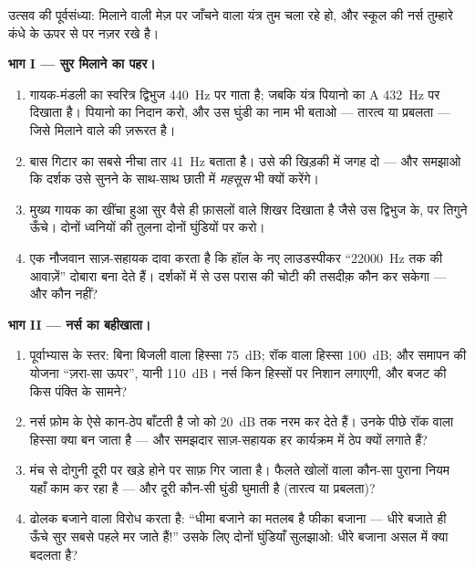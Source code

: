 \begin{problem}\label{pb:g8:sound-pitch-loudness:1}
उत्सव की पूर्वसंध्या: मिलाने वाली मेज़ पर जाँचने वाला यंत्र तुम चला
रहे हो, और स्कूल की नर्स तुम्हारे कंधे के ऊपर से   पर नज़र
रखे है।

\medskip\noindent\textbf{भाग I --- सुर मिलाने का पहर।}
\begin{enumerate}
  \item गायक-मंडली का स्वरित्र द्विभुज \qty{440}{Hz} पर गाता है;
        जबकि यंत्र पियानो का A \qty{432}{Hz} पर दिखाता है। पियानो
        का निदान करो, और उस घुंडी का नाम भी बताओ --- तारत्व या
        प्रबलता --- जिसे मिलाने वाले की ज़रूरत है।
  \item बास गिटार का सबसे नीचा तार \qty{41}{Hz} बताता है। उसे 
        की खिड़की में जगह दो --- और समझाओ कि दर्शक उसे सुनने के साथ-साथ
        छाती में \emph{महसूस} भी क्यों करेंगे।
  \item मुख्य गायक का खींचा हुआ सुर वैसे ही फ़ासलों वाले शिखर दिखाता
        है जैसे उस द्विभुज के, पर तिगुने ऊँचे। दोनों ध्वनियों की
        तुलना दोनों घुंडियों पर करो।
  \item एक नौजवान साज़-सहायक दावा करता है कि हॉल के नए लाउडस्पीकर
        ``\qty{22000}{Hz} तक की आवाज़ें'' दोबारा बना देते हैं। दर्शकों
        में से उस परास की चोटी की तसदीक़ कौन कर सकेगा --- और कौन
        नहीं?
\end{enumerate}

\medskip\noindent\textbf{भाग II --- नर्स का बहीखाता।}
\begin{enumerate}[resume]
  \item पूर्वाभ्यास के स्तर: बिना बिजली वाला हिस्सा \qty{75}{dB};
        रॉक वाला हिस्सा \qty{100}{dB}; और समापन की योजना ``ज़रा-सा
        ऊपर'', यानी \qty{110}{dB}। नर्स किन हिस्सों पर निशान लगाएगी,
        और बजट की किस पंक्ति के सामने?
  \item नर्स फ़ोम के ऐसे कान-ठेप बाँटती है जो  को \qty{20}{dB}
        तक नरम कर देते हैं। उनके पीछे रॉक वाला हिस्सा क्या बन जाता है
        --- और समझदार साज़-सहायक हर कार्यक्रम में ठेप क्यों लगाते
        हैं?
  \item मंच से दोगुनी दूरी पर खड़े होने पर  साफ़ गिर जाता है।
        फैलते खोलों वाला कौन-सा पुराना नियम यहाँ काम कर रहा है ---
        और दूरी कौन-सी घुंडी घुमाती है (तारत्व या प्रबलता)?
  \item ढोलक बजाने वाला विरोध करता है: ``धीमा बजाने का मतलब है फीका
        बजाना --- धीरे बजाते ही ऊँचे सुर सबसे पहले मर जाते हैं!'' उसके
        लिए दोनों घुंडियाँ सुलझाओ: धीरे बजाना असल में क्या बदलता है?
\end{enumerate}


\end{problem}
